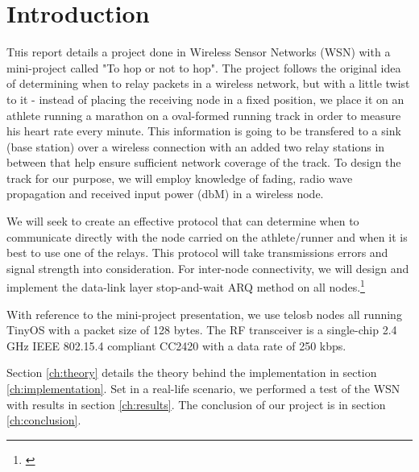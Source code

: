 \section{Introduction}\label{ch:introduction}

\lettrine[nindent=0em,lines=3]{T} his report details a project done in Wireless Sensor Networks (WSN) with a mini-project called "To hop or not to hop". The project follows the original idea of determining when to relay packets in a wireless network, but with a little twist to it - instead of placing the receiving node in a fixed position, we place it on an athlete running a marathon on a oval-formed running track in order to measure his heart rate every minute. This information is going to be transfered to a sink (base station) over a wireless connection with an added two relay stations in between that help ensure sufficient network coverage of the track. To design the track for our purpose, we will employ knowledge of fading, radio wave propagation and received input power (dbM) in a wireless node.

\noindent We will seek to create an effective protocol that can determine when to communicate directly with the node carried on the athlete/runner and when it is best to use one of the relays. This protocol will take transmissions errors and signal strength into consideration. For inter-node connectivity, we will design and implement the data-link layer stop-and-wait ARQ method on all nodes.\footnote{\cite{Ieee}}

\noindent With reference to the mini-project presentation, we use telosb nodes all running TinyOS with a packet size of 128 bytes. The RF transceiver is a single-chip 2.4 GHz IEEE 802.15.4 compliant CC2420 with a data rate of 250 kbps.

\noindent Section \ref{ch:theory} details the theory behind the implementation in section \ref{ch:implementation}. Set in a real-life scenario, we performed a test of the WSN with results in section \ref{ch:results}. The conclusion of our project is in section \ref{ch:conclusion}.


